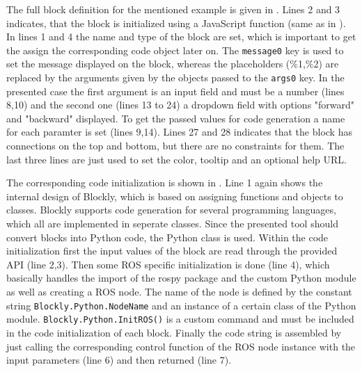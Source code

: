 The full block definition for the mentioned example is given in . Lines 2 and 3 indicates, that the block is initialized using a JavaScript function (same as in ). In lines 1 and 4 the name and type of the block are set, which is important to get the assign the corresponding code object later on. The \lstinline!message0! key is used to set the message displayed on the block, whereas the placeholders (\%1,\%2) are replaced by the arguments given by the objects passed to the \lstinline!args0! key. In the presented case the first argument is an input field and must be a number (lines 8,10) and the second one (lines 13 to 24) a dropdown field with options "forward" and "backward" displayed. To get the passed values for code generation a name for each paramter is set (lines 9,14). Lines 27 and 28 indicates that the block has connections on the top and bottom, but there are no constraints for them. The last three lines are just used to set the color, tooltip and an optional help URL. \\


\begin{figure}[htbp]
	
\end{figure}

The corresponding code initialization is shown in . Line 1 again shows the internal design of Blockly, which is based on assigning functions and objects to classes. Blockly supports code generation for several programming languages, which all are implemented in seperate classes. Since the presented tool should convert blocks into Python code, the Python class is used. Within the code initialization first the input values of the block are read through the provided API (line 2,3). Then some ROS specific initialization is done (line 4), which basically handles the import of the rospy package and the custom Python module as well as creating a ROS node. The name of the node is defined by the constant string \lstinline!Blockly.Python.NodeName! and an instance of a certain class of the Python module. \lstinline!Blockly.Python.InitROS()! is a custom command and must be included in the code initialization of each block. Finally the code string is assembled by just calling the corresponding control function of the ROS node instance with the input parameters (line 6) and then returned (line 7).

